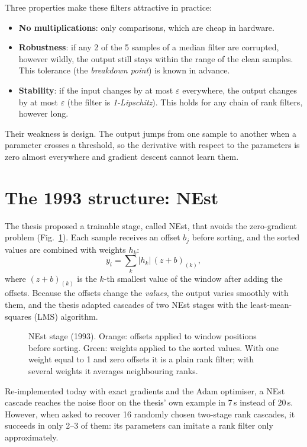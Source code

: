 \documentclass[11pt,a4paper]{article}
\begin{document}
Three properties make these filters attractive in practice:
\begin{itemize}\itemsep0pt
\item \textbf{No multiplications}: only comparisons, which are cheap in hardware.
\item \textbf{Robustness}: if any 2 of the 5 samples of a median filter are corrupted, however wildly, the output still
  stays within the range of the clean samples. This tolerance (the \emph{breakdown point}) is known in advance.
\item \textbf{Stability}: if the input changes by at most $\varepsilon$ everywhere, the output changes by at most
  $\varepsilon$ (the filter is \emph{1-Lipschitz}). This holds for any chain of rank filters, however long.
\end{itemize}
Their weakness is design. The output jumps from one sample to another when a parameter crosses a threshold, so the
derivative with respect to the parameters is zero almost everywhere and gradient descent cannot learn them.

\section{The 1993 structure: NEst}\label{sec:nest}
The thesis proposed a trainable stage, called NEst, that avoids the zero-gradient problem (Fig.~\ref{fig:nest}).
Each sample receives an offset $b_j$ before sorting, and the sorted values are combined with weights $h_k$:
\[
y_i=\sum_{k}|h_k|\,(z+b)_{(k)} ,
\]
where $(z+b)_{(k)}$ is the $k$-th smallest value of the window after adding the offsets. Because the offsets change the
\emph{values}, the output varies smoothly with them, and the thesis adapted cascades of two NEst stages with the
least-mean-squares (LMS) algorithm.

\begin{figure}[h]\centering
\resizebox{0.86\linewidth}{!}{}
\caption{NEst stage (1993). Orange: offsets applied to window positions before sorting. Green: weights applied to the
sorted values. With one weight equal to 1 and zero offsets it is a plain rank filter; with several weights it averages
neighbouring ranks.}\label{fig:nest}
\end{figure}

Re-implemented today with exact gradients and the Adam optimiser, a NEst cascade reaches the noise floor on the thesis'
own example in 7\,s instead of 20\,s. However, when asked to recover 16 randomly chosen two-stage rank cascades, it
succeeds in only 2--3 of them: its parameters can imitate a rank filter only approximately.
\end{document}
